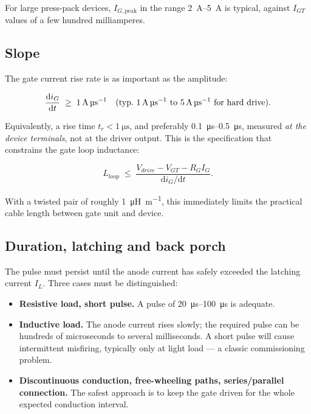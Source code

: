 For large press-pack devices, $I_{G,\text{peak}}$ in the range
\SIrange{2}{5}{\ampere} is typical, against $I_{GT}$ values of a few hundred
milliamperes.

\subsection{Slope}

The gate current rise rate is as important as the amplitude:

\begin{equation}
  \frac{\mathrm{d}i_G}{\mathrm{d}t} \;\ge\; \SI{1}{\ampere\per\micro\second}
  \quad \text{(typ.\ \SIrange{1}{5}{\ampere\per\micro\second} for hard drive).}
  \label{thygate:eq:didt}
\end{equation}

Equivalently, a rise time $t_r < \SI{1}{\micro\second}$, and preferably
\SIrange{0.1}{0.5}{\micro\second}, measured \emph{at the device terminals}, not at
the driver output. This is the specification that constrains the gate loop
inductance:

\begin{equation}
  L_{loop} \;\le\; \frac{V_{drive} - V_{GT} - R_G I_G}{\mathrm{d}i_G/\mathrm{d}t}.
  \label{thygate:eq:lloop}
\end{equation}

With a twisted pair of roughly \SI{1}{\micro\henry\per\metre}, this immediately
limits the practical cable length between gate unit and device.

\subsection{Duration, latching and back porch}

The pulse must persist until the anode current has safely exceeded the latching
current $I_L$. Three cases must be distinguished:

\begin{itemize}
  \item \textbf{Resistive load, short pulse.} A pulse of
        \SIrange{20}{100}{\micro\second} is adequate.
  \item \textbf{Inductive load.} The anode current rises slowly; the required pulse
        can be hundreds of microseconds to several milliseconds. A short pulse will
        cause intermittent misfiring, typically only at light load --- a classic
        commissioning problem.
  \item \textbf{Discontinuous conduction, free-wheeling paths, series/parallel
        connection.} The safest approach is to keep the gate driven for the whole
        expected conduction interval.
\end{itemize}

